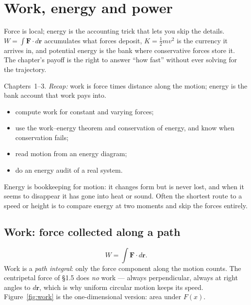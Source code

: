 \chapter{Work, energy and power}\label{ch:energy}

Force is local; energy is the accounting trick that lets you skip the
details. $W=\int\mathbf F\cdot d\mathbf r$ accumulates what forces deposit,
$K=\tfrac12mv^{2}$ is the currency it arrives in, and potential energy is
the bank where conservative forces store it. The chapter's payoff is the
right to answer ``how fast'' without ever solving for the trajectory.

\begin{rulebox}
Chapters~1--3. \emph{Recap:} work is force times distance along the motion; energy is the bank account that work pays into.
\end{rulebox}
\begin{wins}
\begin{itemize}
\item compute work for constant and varying forces;
\item use the work--energy theorem and conservation of energy, and know when conservation fails;
\item read motion from an energy diagram;
\item do an energy audit of a real system.
\end{itemize}
\end{wins}
\begin{principle}
Energy is bookkeeping for motion: it changes form but is never lost, and when it seems to disappear it has gone into heat or sound. Often the shortest route to a speed or height is to compare energy at two moments and skip the forces entirely.
\end{principle}

\section{Work: force collected along a path}\label{sec:en-work}

\begin{equation}
  W=\int\mathbf F\cdot d\mathbf r.\label{eq:work}
\end{equation}
Work is a \emph{path integral}: only the force component along the motion
counts. The centripetal force of \S1.5 does \emph{no} work --- always
perpendicular, always at right angles to $d\mathbf r$, which is why
uniform circular motion keeps its speed. Figure~\ref{fig:work} is the
one-dimensional version: area under $F(x)$.

